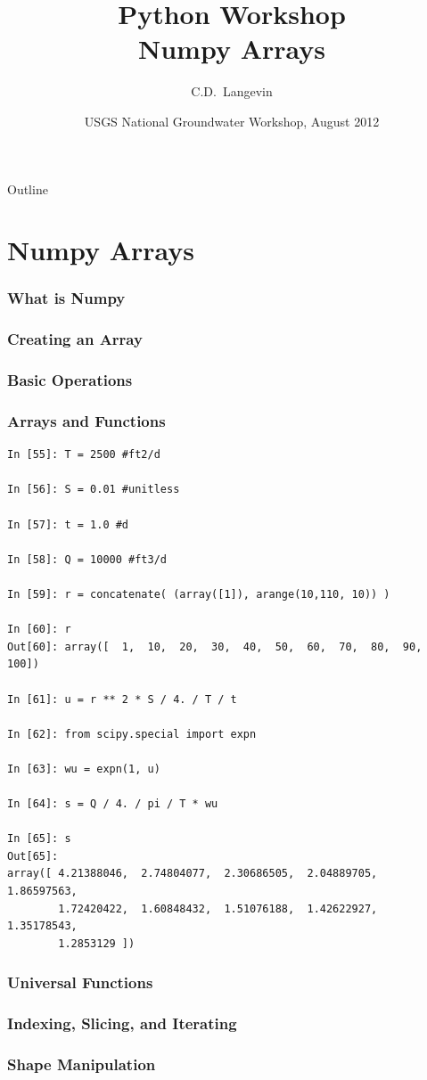 \documentclass{beamer}
\title[]{Python Workshop\\
Numpy Arrays}
\author[Langevin] %
{C.D.~Langevin}
\institute[USGS] %
{
  U.S. Geological Survey\\
  Reston, Virginia, USA
  }
\date[UQ12] %
{USGS National Groundwater Workshop, August 2012}
\begin{document}
\begin{frame}
  \titlepage
\end{frame}


\begin{frame}{Outline}
\tableofcontents
\end{frame}

\section{Numpy Arrays}
\begin{frame}[fragile]
\frametitle{What is Numpy}
\end{frame}

\begin{frame}[fragile]
\frametitle{Creating an Array}
\end{frame}

\begin{frame}[fragile]
\frametitle{Basic Operations}
\end{frame}

\begin{frame}[fragile]
\frametitle{Arrays and Functions}
\begin{lstlisting}
In [55]: T = 2500 #ft2/d

In [56]: S = 0.01 #unitless

In [57]: t = 1.0 #d

In [58]: Q = 10000 #ft3/d

In [59]: r = concatenate( (array([1]), arange(10,110, 10)) )

In [60]: r
Out[60]: array([  1,  10,  20,  30,  40,  50,  60,  70,  80,  90, 100])

In [61]: u = r ** 2 * S / 4. / T / t

In [62]: from scipy.special import expn

In [63]: wu = expn(1, u)

In [64]: s = Q / 4. / pi / T * wu

In [65]: s
Out[65]:
array([ 4.21388046,  2.74804077,  2.30686505,  2.04889705,  1.86597563,
        1.72420422,  1.60848432,  1.51076188,  1.42622927,  1.35178543,
        1.2853129 ])
\end{lstlisting}
\end{frame}


\begin{frame}[fragile]
\frametitle{Universal Functions}
\end{frame}

\begin{frame}[fragile]
\frametitle{Indexing, Slicing, and Iterating}
\end{frame}

\begin{frame}[fragile]
\frametitle{Shape Manipulation}
\end{frame}
\end{document}
